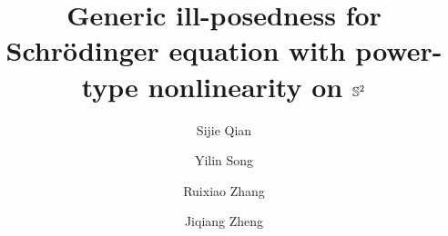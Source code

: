 \documentclass[11pt, reqno]{amsart}
\numberwithin{equation}{section}
\theoremstyle{definition}
\theoremstyle{remark}
\begin{document}
	
	\title[Nonlinear Schr\"odinger equations]{ \bf Generic ill-posedness for  Schr\"odinger equation with power-type  nonlinearity on $\Bbb{S}^2$ }
	
	\author{Sijie Qian}
\address{Sijie Qian
\newline \indent The Graduate School of China Academy of Engineering Physics, Beijing 100088,\ P. R. China}
	\author{Yilin Song}
\address{Yilin Song
\newline \indent The Graduate School of China Academy of Engineering Physics, Beijing 100088,\ P. R. China}
	
\author{Ruixiao Zhang}
\address{Ruixiao Zhang
\newline \indent The Graduate School of China Academy of Engineering Physics, Beijing 100088,\ P. R. China}
	
\author{Jiqiang Zheng}
\address{Jiqiang Zheng
\newline \indent Institute of Applied Physics and Computational Mathematics, Beijing, 100088, China.
\newline\indent
National Key Laboratory of Computational Physics, Beijing 100088, China}

	
	
\end{document}
